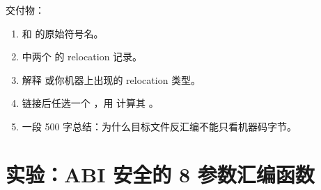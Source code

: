 \begin{labbox}
交付物：

\begin{enumerate}
  \item {} 和  的原始符号名。
  \item {} 中两个  的 relocation 记录。
  \item 解释  或你机器上出现的 relocation 类型。
  \item 链接后任选一个 ，用  计算其 。
  \item 一段 500 字总结：为什么目标文件反汇编不能只看机器码字节。
\end{enumerate}
\end{labbox}

\section{实验：ABI 安全的 8 参数汇编函数}

